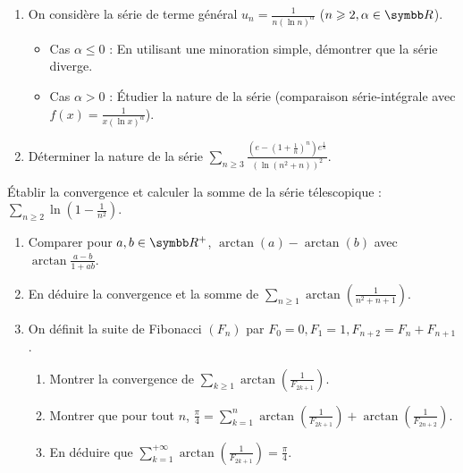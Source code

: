\begin{exercice}
\begin{enumerate}
    \item On considère la série de terme général $u_{n}=\frac{1}{n(\ln n)^{\alpha}}$ ($n\geqslant2, \alpha\in\R$).
    \begin{itemize}
        \item Cas $\alpha\leqslant0$ : En utilisant une minoration simple, démontrer que la série diverge.
        \item Cas $\alpha>0$ : Étudier la nature de la série (comparaison série-intégrale avec $f(x)=\frac{1}{x(\ln x)^{\alpha}}$).
    \end{itemize}
    \item Déterminer la nature de la série $\sum_{n\geqslant3}\frac{\left(e-\left(1+\frac{1}{n}\right)^{n}\right)e^{\frac{1}{n}}}{(\ln(n^{2}+n))^{2}}$.
\end{enumerate}
\end{exercice}

\begin{exercice}
    Établir la convergence et calculer la somme de la série télescopique : $\sum_{n\geqslant2}\ln\left(1-\frac{1}{n^{2}}\right)$.
\end{exercice}

\begin{exercice}
\begin{enumerate}
    \item Comparer pour $a, b \in \R^{+}$, $\arctan(a) - \arctan(b)$ avec $\arctan \frac{a-b}{1+ab}$.
    \item En déduire la convergence et la somme de $\sum_{n\geqslant1}\arctan\left(\frac{1}{n^{2}+n+1}\right)$.
    \item On définit la suite de Fibonacci $(F_{n})$ par $F_{0}=0, F_{1}=1, F_{n+2}=F_{n}+F_{n+1}$.
    \begin{enumerate}
        \item Montrer la convergence de $\sum_{k\geqslant1}\arctan\left(\frac{1}{F_{2k+1}}\right)$.
        \item Montrer que pour tout $n$, $\displaystyle\frac{\pi}{4}=\sum_{k=1}^{n}\arctan\left(\frac{1}{F_{2k+1}}\right)+\arctan\left(\frac{1}{F_{2n+2}}\right)$.
        \item En déduire que $\displaystyle\sum_{k=1}^{+\infty}\arctan\left(\frac{1}{F_{2k+1}}\right) = \frac{\pi}{4}$.
    \end{enumerate}
\end{enumerate}
\end{exercice}

